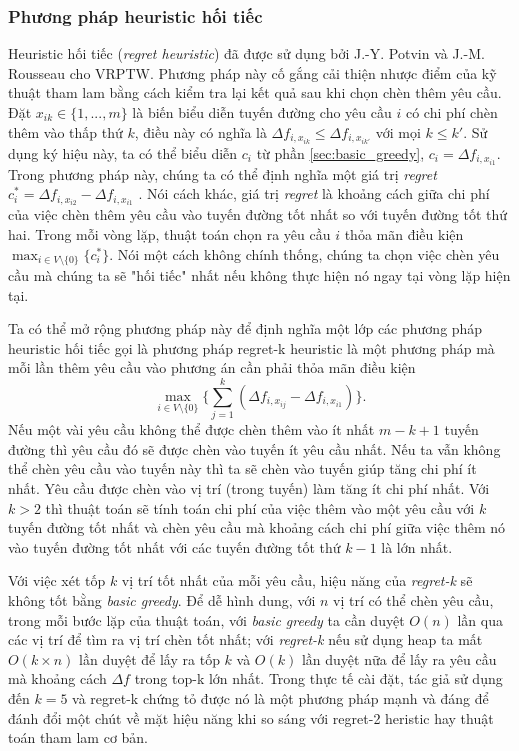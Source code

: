 \subsubsection{Phương pháp heuristic hối tiếc}
Heuristic hối tiếc (\textit{regret heuristic}) đã được sử dụng bởi J.-Y. Potvin và J.-M. Rousseau \cite{potvin1993parallel} cho VRPTW. Phương pháp này cố gắng cải thiện nhược điểm của kỹ thuật tham lam bằng cách kiểm tra lại kết quả sau khi chọn chèn thêm yêu cầu. Đặt $x_{ik} \in \{1, ..., m\}$ là biến biểu diễn tuyến đường cho yêu cầu $i$ có chi phí chèn thêm vào thấp thứ $k$, điều này có nghĩa là $\Delta f_{i, x_{ik}} \leqslant \Delta f_{i, x_{ik'}}$ với mọi $k \leq k'$. Sử dụng ký hiệu này, ta có thể biểu diễn $c_i$ từ phần \ref{sec:basic_greedy}, $c_i = \Delta f_{i, x_{i1}}$. Trong phương pháp này, chúng ta có thể định nghĩa một giá trị \textit{regret} $c_i^* = \Delta f_{i, x_{i2}} - \Delta f_{i, x_{i1}}$ . Nói cách khác, giá trị \textit{regret} là khoảng cách giữa chi phí của việc chèn thêm yêu cầu vào tuyến đường tốt nhất so với tuyến đường tốt thứ hai. Trong mỗi vòng lặp, thuật toán chọn ra yêu cầu $i$ thỏa mãn điều kiện $\max_{i \in V \setminus \{0\}} \{c_i^*\}$. Nói một cách không chính thống, chúng ta chọn việc chèn yêu cầu mà chúng ta sẽ "hối tiếc" nhất nếu không thực hiện nó ngay tại vòng lặp hiện tại.

Ta có thể mở rộng phương pháp này để định nghĩa một lớp các phương pháp heuristic hối tiếc gọi là phương pháp regret-k heuristic là một phương pháp mà mỗi lần thêm yêu cầu vào phương án cần phải thỏa mãn điều kiện
\begin{equation}
    \max\limits_{i \in V \setminus \{0\} } \{ \sum_{j=1}^k (\Delta f_{i, x_{ij}} - \Delta f_{i, x_{i1}}) \}.
\end{equation}
Nếu một vài yêu cầu không thể được chèn thêm vào ít nhất $m-k+1$ tuyến đường thì yêu cầu đó sẽ được chèn vào tuyến ít yêu cầu nhất. Nếu ta vẫn không thể chèn yêu cầu vào tuyến này thì ta sẽ chèn vào tuyến giúp tăng chi phí ít nhất. Yêu cầu được chèn vào vị trí (trong tuyến) làm tăng ít chi phí nhất. Với $k>2$ thì thuật toán sẽ tính toán chi phí của việc thêm vào một yêu cầu với $k$ tuyến đường tốt nhất và chèn yêu cầu mà khoảng cách chi phí giữa việc thêm nó vào tuyến đường tốt nhất với các tuyến đường tốt thứ $k-1$ là lớn nhất. 

Với việc xét tốp $k$ vị trí tốt nhất của mỗi yêu cầu, hiệu năng của \textit{regret-k} sẽ không tốt bằng \textit{basic greedy}. Để dễ hình dung, với $n$ vị trí có thể chèn yêu cầu, trong mỗi bước lặp của thuật toán, với \textit{basic greedy} ta cần duyệt $O(n)$ lần qua các vị trí để tìm ra vị trí chèn tốt nhất; với \textit{regret-k} nếu sử dụng heap ta mất $O(k \times n)$ lần duyệt để  lấy ra tốp $k$ và $O(k)$ lần duyệt nữa để lấy ra yêu cầu mà khoảng cách $\Delta f$ trong top-k lớn nhất. Trong thực tế cài đặt, tác giả sử dụng đến $k=5$ và regret-k chứng tỏ được nó là một phương pháp mạnh và đáng để đánh đổi một chút về mặt hiệu năng khi so sáng với regret-2 heristic hay thuật toán tham lam cơ bản.